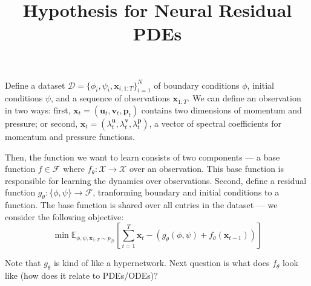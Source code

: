 \documentclass[12pt]{article}
\begin{document}
\title{Hypothesis for Neural Residual PDEs}
\maketitle

\noindent Define a dataset $\mathcal{D} = \{ \phi_i, \psi_i, \mathbf{x}_{i, 1:T} \}_{i=1}^N$ of boundary conditions $\phi$, initial conditions $\psi$, and a sequence of observations $\mathbf{x}_{1:T}$. We can define an observation in two ways: first, $\mathbf{x}_t = (\mathbf{u}_t, \mathbf{v}_t, \mathbf{p}_t)$ contains two dimensions of momentum and pressure; or second, $\mathbf{x}_t = (\lambda_t^{\mathbf{u}}, \lambda_t^{\mathbf{v}}, \lambda_t^{\mathbf{p}})$, a vector of spectral coefficients for momentum and pressure functions.\newline

\noindent Then, the function we want to learn consists of two components --- a base function $f \in \mathcal{F}$ where $f_\theta: \mathcal{X} \rightarrow \mathcal{X}$ over an observation. This base function is responsible for learning the dynamics over observations. Second, define a residual function $g_\theta: \{\phi, \psi\} \rightarrow \mathcal{F}$, tranforming boundary and initial conditions to a function. The base function is shared over all entries in the dataset --- we consider the following objective:
\begin{equation}
    \min \mathbb{E}_{\phi,\psi,\mathbf{x}_{1:T} \sim p_{\mathcal{D}}}\left[ \sum_{t=1}^T \mathbf{x}_t - (g_\theta(\phi,\psi) + f_\theta(\mathbf{x}_{t-1})) \right]
\end{equation}

\noindent Note that $g_\theta$ is kind of like a hypernetwork. Next question is what does $f_\theta$ look like (how does it relate to PDEs/ODEs)?
\end{document}
